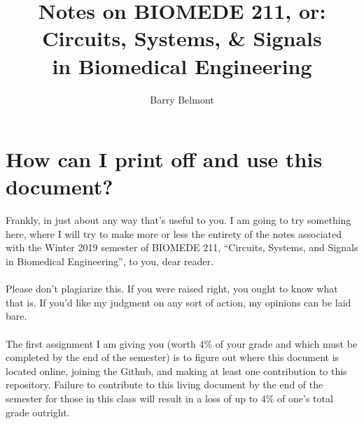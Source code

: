 \documentclass[11pt]{book}
\title{Notes on BIOMEDE 211, or: \\ Circuits, Systems, \& Signals \\ in Biomedical Engineering}
\author{Barry Belmont}
\begin{document}
\frontmatter
\maketitle
\dominitoc
\tableofcontents


\newpage 
\section{How can I print off and use this document?}
Frankly, in just about any way that’s useful to you. I am going to try something here, where I will try to make more or less the entirety of the notes associated with the Winter 2019 semester of BIOMEDE 211, ``Circuits, Systems, and Signals in Biomedical Engineering'', to you, dear reader.\\
\\
Please don’t plagiarize this. If you were raised right, you ought to know what that is. If you’d like my judgment on any sort of action, my opinions can be laid bare.\\
\\
The first assignment I am giving you (worth 4\% of your grade and which must be completed by the end of the semester) is to figure out where this document is located online, joining the Github, and making at least one contribution to this repository. Failure to contribute to this living document by the end of the semester for those in this class will result in a loss of up to 4\% of one's total grade outright.

\newpage
\end{document}
